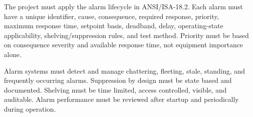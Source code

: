 The project must apply the alarm lifecycle in ANSI/ISA-18.2. Each alarm must have a unique identifier, cause, consequence, required response, priority, maximum response time, setpoint basis, deadband, delay, operating-state applicability, shelving/suppression rules, and test method. Priority must be based on consequence severity and available response time, not equipment importance alone.

Alarm systems must detect and manage chattering, fleeting, stale, standing, and frequently occurring alarms. Suppression by design must be state based and documented. Shelving must be time limited, access controlled, visible, and auditable. Alarm performance must be reviewed after startup and periodically during operation.
